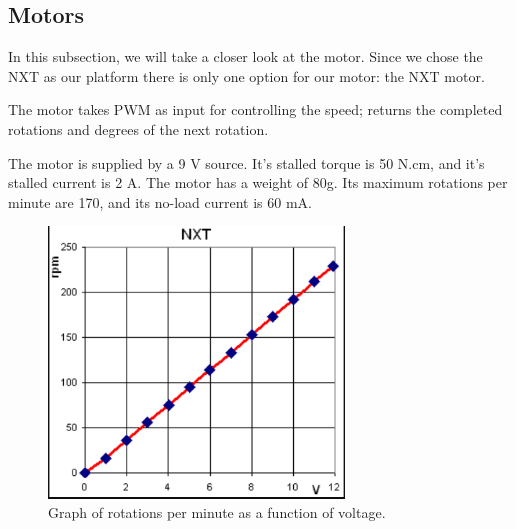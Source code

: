\subsection{Motors} \label{analysisMotors}

In this subsection, we will take a closer look at the motor. Since we chose the NXT as our platform there is only one option for our motor: the NXT motor.


The motor takes PWM as input for controlling the speed; returns the completed rotations and degrees of the next rotation.

The motor is supplied by a 9 V source. It's stalled torque is 50 N.cm, and it's stalled current is 2 A. The motor has a weight of 80g. Its maximum rotations per minute are 170, and its no-load current is 60 mA.\cite{motors}

\begin{figure}[!ht]
    \centering
	\includegraphics[width=0.7\textwidth]{Images/Analysis/nxtmotor.PNG}
    \caption{Graph of rotations per minute as a function of voltage.\cite{motors}}
    \label{fig:nxtmotor}
\end{figure}